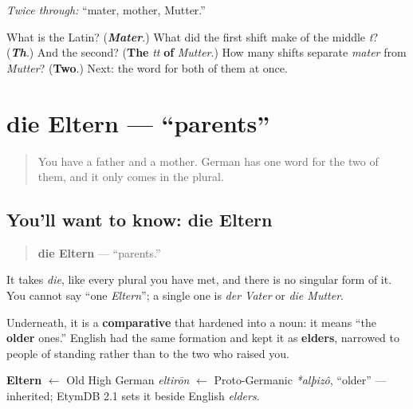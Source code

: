 \emph{Twice through:} \textquotedblleft{}mater, mother, Mutter.\textquotedblright{}

\begin{tcolorbox}[breakable,colback=teal!4,colframe=teal!35!black,title={Before you move on}]
What is the Latin? (\emph{\textbf{Mater}}.) What did the first shift make of the middle \emph{t}? (\emph{\textbf{Th}}.) And the second? (\textbf{The} \emph{tt} \textbf{of} \emph{Mutter}.) How many shifts separate \emph{mater} from \emph{Mutter}? (\textbf{Two}.) Next: the word for both of them at once.
\end{tcolorbox}
\section[die Eltern]{die Eltern — \textquotedblleft{}parents\textquotedblright{}}

\label{lesson:GE-C10-eltern}



\begin{quote}
You have a father and a mother. German has one word for the two of them, and it only comes in the plural.
\end{quote}

\subsection*{You'll want to know: die Eltern}
\begin{quote}
\textbf{die Eltern} — \textquotedblleft{}parents.\textquotedblright{}
\end{quote}

It takes \emph{die}, like every plural you have met, and there is no singular form of it. You cannot say \textquotedblleft{}one \emph{Eltern}\textquotedblright{}; a single one is \emph{der Vater} or \emph{die Mutter}.

Underneath, it is a \textbf{comparative} that hardened into a noun: it means \textquotedblleft{}the \textbf{older} ones.\textquotedblright{} English had the same formation and kept it as \textbf{elders}, narrowed to people of standing rather than to the two who raised you.

\begin{cousinweb}
\textbf{Eltern} $\leftarrow$ Old High German \emph{eltirōn} $\leftarrow$ Proto-Germanic \emph{*alþizô}, \textquotedblleft{}older\textquotedblright{} — inherited; EtymDB 2.1 sets it beside English \emph{elders}.
\end{cousinweb}

